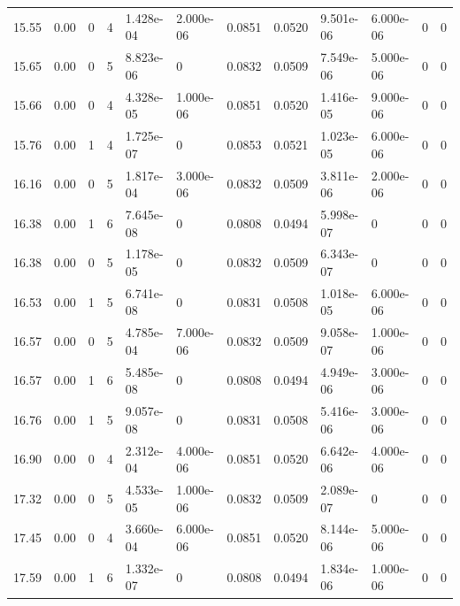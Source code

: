 \documentclass[preview]{standalone}
\begin{document}
{{{\begin{tabular}{L{1.2cm}C{1.2cm} C{0.3cm}C{0.5cm} C{1.4cm}C{1.4cm} C{1.4cm}C{1.4cm} C{1.6cm}C{1.6cm} C{1.6cm}C{1.6cm}}
  15.55  &  0.00  & 0     &  4 &  1.428e-04  & 2.000e-06  &  0.0851&   0.0520& 9.501e-06 & 6.000e-06   &  0 & 0  \\ 
  15.65  &  0.00  & 0     &  5 &  8.823e-06  & 0  &  0.0832&   0.0509& 7.549e-06 & 5.000e-06   &  0 & 0  \\ 
  15.66  &  0.00  & 0     &  4 &  4.328e-05  & 1.000e-06  &  0.0851&   0.0520& 1.416e-05 & 9.000e-06   &  0 & 0  \\ 
  15.76  &  0.00  & 1     &  4 &  1.725e-07  & 0  &  0.0853&   0.0521& 1.023e-05 & 6.000e-06   &  0 & 0  \\ 
  16.16  &  0.00  & 0     &  5 &  1.817e-04  & 3.000e-06  &  0.0832&   0.0509& 3.811e-06 & 2.000e-06   &  0 & 0  \\ 
  16.38  &  0.00  & 1     &  6 &  7.645e-08  & 0  &  0.0808&   0.0494& 5.998e-07 & 0   &  0 & 0  \\ 
  16.38  &  0.00  & 0     &  5 &  1.178e-05  & 0  &  0.0832&   0.0509& 6.343e-07 & 0   &  0 & 0  \\ 
  16.53  &  0.00  & 1     &  5 &  6.741e-08  & 0  &  0.0831&   0.0508& 1.018e-05 & 6.000e-06   &  0 & 0  \\ 
  16.57  &  0.00  & 0     &  5 &  4.785e-04  & 7.000e-06  &  0.0832&   0.0509& 9.058e-07 & 1.000e-06   &  0 & 0  \\ 
  16.57  &  0.00  & 1     &  6 &  5.485e-08  & 0  &  0.0808&   0.0494& 4.949e-06 & 3.000e-06   &  0 & 0  \\ 
  16.76  &  0.00  & 1     &  5 &  9.057e-08  & 0  &  0.0831&   0.0508& 5.416e-06 & 3.000e-06   &  0 & 0  \\ 
  16.90  &  0.00  & 0     &  4 &  2.312e-04  & 4.000e-06  &  0.0851&   0.0520& 6.642e-06 & 4.000e-06   &  0 & 0  \\ 
  17.32  &  0.00  & 0     &  5 &  4.533e-05  & 1.000e-06  &  0.0832&   0.0509& 2.089e-07 & 0   &  0 & 0  \\ 
  17.45  &  0.00  & 0     &  4 &  3.660e-04  & 6.000e-06  &  0.0851&   0.0520& 8.144e-06 & 5.000e-06   &  0 & 0  \\ 
  17.59  &  0.00  & 1     &  6 &  1.332e-07  & 0  &  0.0808&   0.0494& 1.834e-06 & 1.000e-06   &  0 & 0  \\ 
\hline 
\end{tabular} 

}}}
\end{document}
